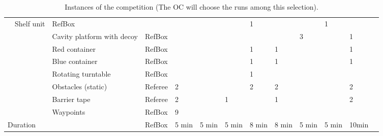 \begin{landscape}
\begin{table}[h!]
\begin{tabular}{|l|l|l|l*{9}{|P{1cm}}|}
        & Shelf unit          & RefBox &       &       &       &     &  1     &        &   & 1   \\ \hhline{~~----------}
      &  & Cavity platform with decoy& RefBox &       &       &       &       &       &  3   &   & 1   \\ \hhline{~~----------}
      &  & Red container       & RefBox &       &       &       &   1   &   1   &       &   & 1   \\ \hhline{~~----------}
      &  & Blue container      & RefBox &       &       &       &   1   &   1   &       &   & 1   \\ \hhline{~~----------}
      &  & Rotating turntable  & RefBox &       &       &       &   1   &     &       &   &    \\ 
    \hhline{------------} \hhline{------------}
     & 
     &     Obstacles (static) & Referee &  2    &       &       &   2   &   2   &       &   & 2   \\ \hhline{~~----------}
     &   & Barrier tape       & Referee &  2    &       &   1   &       &   1    &       &   & 2   \\ \hhline{~~----------}
     &   & Waypoints          & RefBox  &  9    &       &       &       &       &       &   &    \\ 
		\hline \hline
		 \multicolumn{3}{|l|}{Duration} 
		                    & RefBox & 5 min   & 5 min & 5 min  &  8 min &  8 min & 5 min & 5 min & 10min \\
		\hline
 \end{tabular}
 \caption{Instances of the \RCAW \YEAR competition (The OC will choose the runs among this selection).}
 \label{tab:Instances}
\end{table}
\end{landscape}


